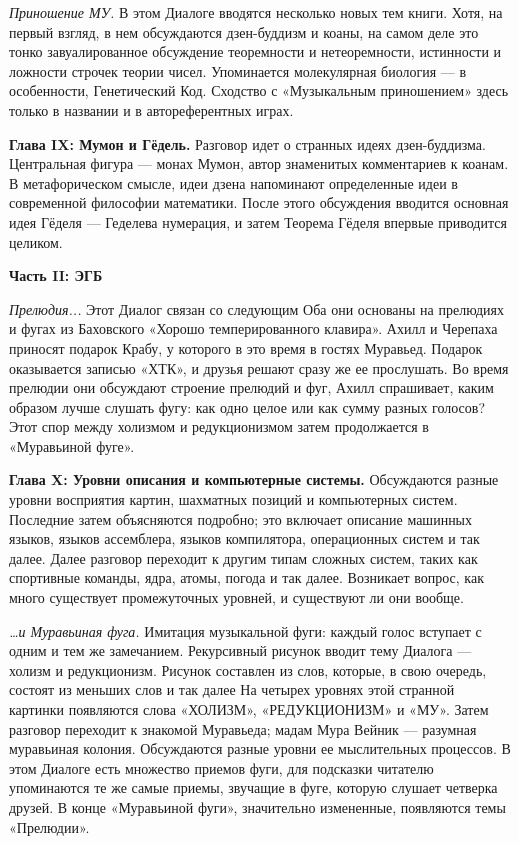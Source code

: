 \emph{Приношение МУ.} В этом Диалоге вводятся несколько новых тем книги. Хотя, на первый взгляд, в нем обсуждаются дзен-буддизм и коаны, на самом деле это тонко завуалированное обсуждение теоремности и нетеоремности, истинности и ложности строчек теории чисел. Упоминается молекулярная биология --- в особенности, Генетический Код. Сходство с «Музыкальным приношением» здесь только в названии и в автореферентных играх.

\textbf{Глава IX: Мумон и Гёдель.} Разговор идет о странных идеях дзен-буддизма. Центральная фигура --- монах Мумон, автор знаменитых комментариев к коанам. В метафорическом смысле, идеи дзена напоминают определенные идеи в современной философии математики. После этого обсуждения вводится основная идея Гёделя --- Геделева нумерация, и затем Теорема Гёделя впервые приводится целиком.

\textbf{Часть II: ЭГБ}

\emph{Прелюдия...} Этот Диалог связан со следующим Оба они основаны на прелюдиях и фугах из Баховского «Хорошо темперированного клавира». Ахилл и Черепаха приносят подарок Крабу, у которого в это время в гостях Муравьед. Подарок оказывается записью «ХТК», и друзья решают сразу же ее прослушать. Во время прелюдии они обсуждают строение прелюдий и фуг, Ахилл спрашивает, каким образом лучше слушать фугу: как одно целое или как сумму разных голосов? Этот спор между холизмом и редукционизмом затем продолжается в «Муравьиной фуге».

\textbf{Глава X: Уровни описания и компьютерные системы.} Обсуждаются разные уровни восприятия картин, шахматных позиций и компьютерных систем. Последние затем объясняются подробно; это включает описание машинных языков, языков ассемблера, языков компилятора, операционных систем и так далее. Далее разговор переходит к другим типам сложных систем, таких как спортивные команды, ядра, атомы, погода и так далее. Возникает вопрос, как много существует промежуточных уровней, и существуют ли они вообще.

\emph{\ldots и Муравьиная фуга.} Имитация музыкальной фуги: каждый голос вступает с одним и тем же замечанием. Рекурсивный рисунок вводит тему Диалога --- холизм и редукционизм. Рисунок составлен из слов, которые, в свою очередь, состоят из меньших слов и так далее На четырех уровнях этой странной картинки появляются слова «ХОЛИЗМ», «РЕДУКЦИОНИЗМ» и «МУ». Затем разговор переходит к знакомой Муравьеда; мадам Мура Вейник --- разумная муравьиная колония. Обсуждаются разные уровни ее мыслительных процессов. В этом Диалоге есть множество приемов фуги, для подсказки читателю упоминаются те же самые приемы, звучащие в фуге, которую слушает четверка друзей. В конце «Муравьиной фуги», значительно измененные, появляются темы «Прелюдии».

